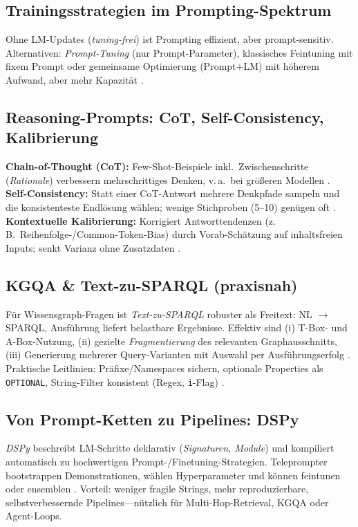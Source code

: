 \subsection{Trainingsstrategien im Prompting-Spektrum}
Ohne LM-Updates (\emph{tuning-frei}) ist Prompting effizient, aber prompt-sensitiv. Alternativen: \emph{Prompt-Tuning} (nur Prompt-Parameter), klassisches Feintuning mit fixem Prompt oder gemeinsame Optimierung (Prompt+LM) mit höherem Aufwand, aber mehr Kapazität \cite{liu2023survey}.

\subsection{Reasoning-Prompts: CoT, Self-Consistency, Kalibrierung}
\textbf{Chain-of-Thought (CoT):} Few-Shot-Beispiele inkl.\ Zwischenschritte (\emph{Rationale}) verbessern mehrschrittiges Denken, v.\,a.\ bei größeren Modellen \cite{wei2022cot}.\\
\textbf{Self-Consistency:} Statt einer CoT-Antwort mehrere Denkpfade sampeln und die konsistenteste Endlösung wählen; wenige Stichproben (5–10) genügen oft \cite{wang2022selfconsistency}.\\
\textbf{Kontextuelle Kalibrierung:} Korrigiert Antworttendenzen (z.\,B.\ Reihenfolge-/Common-Token-Bias) durch Vorab-Schätzung auf inhaltsfreien Inputs; senkt Varianz ohne Zusatzdaten \cite{zhao2021calibrate}.

\subsection{KGQA \& Text-zu-SPARQL (praxisnah)}
Für Wissensgraph-Fragen ist \emph{Text-zu-SPARQL} robuster als Freitext: NL $\rightarrow$ SPARQL, Ausführung liefert belastbare Ergebnisse. Effektiv sind (i) T-Box- und A-Box-Nutzung, (ii) gezielte \emph{Fragmentierung} des relevanten Graphausschnitts, (iii) Generierung mehrerer Query-Varianten mit Auswahl per Ausführungserfolg \cite{avila2024autokgqagpt}. Praktische Leitlinien: Präfixe/Namespaces sichern, optionale Properties als \texttt{OPTIONAL}, String-Filter konsistent (Regex, \texttt{i}-Flag) \cite{avila2024autokgqagpt}.

\subsection{Von Prompt-Ketten zu Pipelines: DSPy}
\emph{DSPy} beschreibt LM-Schritte deklarativ (\emph{Signaturen, Module}) und kompiliert automatisch zu hochwertigen Prompt-/Finetuning-Strategien. Teleprompter bootstrappen Demonstrationen, wählen Hyperparameter und können feintunen oder ensemblen \cite{khattab2023dspy}. Vorteil: weniger fragile Strings, mehr reproduzierbare, selbstverbessernde Pipelines—nützlich für Multi-Hop-Retrieval, KGQA oder Agent-Loops.

